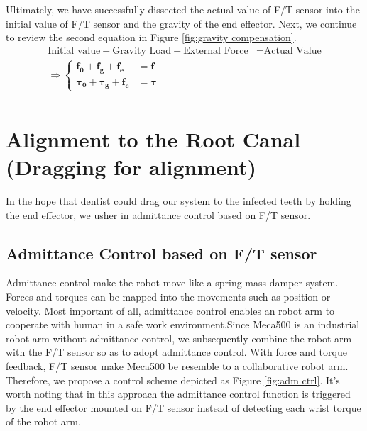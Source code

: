Ultimately, we have successfully dissected the actual value of F/T sensor into the initial value of F/T sensor and the gravity of the end effector. Next, we continue to review the second equation in  Figure \ref{fig:gravity compensation}.
\begin{equation}
\begin{split}
\text{Initial value}	+ \text{Gravity Load} 		+ \text{External Force}		&= \text{Actual Value} \\
\Rightarrow \left\{\begin{matrix}
\boldsymbol{f_0}		+\boldsymbol{f_g}		+\boldsymbol{f_e}		&= \boldsymbol{f}\\ 
\boldsymbol{\tau_0}		+\boldsymbol{\tau_g}	+\boldsymbol{f_e}		&= \boldsymbol{\tau}	
\end{matrix}\right.	\\
\end{split}
\end{equation}

\section{Alignment to the Root Canal (Dragging for alignment)}
In the hope that dentist could drag our system to the infected teeth by holding the end effector, we usher in admittance control based on F/T sensor.
\subsection{Admittance Control based on F/T sensor}
Admittance control make the robot move like a spring-mass-damper system. Forces and torques can be mapped into the movements such as position or velocity. Most important of all, admittance control enables an robot arm to cooperate with human in a safe work environment.Since Meca500 is an industrial robot arm without admittance control, we subsequently combine the robot arm with the F/T sensor so as to adopt admittance control. With force and torque feedback, F/T sensor make Meca500 be resemble to a collaborative robot arm. Therefore, we propose a control scheme depicted as Figure \ref{fig:adm ctrl}. It's worth noting that in this approach the admittance control function is triggered by the end effector mounted on F/T sensor instead of detecting each wrist torque of the robot arm.

